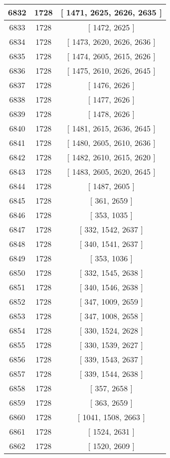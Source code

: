 \begin{center}
\begin{longtable}[H]{|| c c c ||}
\hline
6832 & 1728 & [ 1471, 2625, 2626, 2635 ] \\ 
\hline
6833 & 1728 & [ 1472, 2625 ] \\ 
\hline
6834 & 1728 & [ 1473, 2620, 2626, 2636 ] \\ 
\hline
6835 & 1728 & [ 1474, 2605, 2615, 2626 ] \\ 
\hline
6836 & 1728 & [ 1475, 2610, 2626, 2645 ] \\ 
\hline
6837 & 1728 & [ 1476, 2626 ] \\ 
\hline
6838 & 1728 & [ 1477, 2626 ] \\ 
\hline
6839 & 1728 & [ 1478, 2626 ] \\ 
\hline
6840 & 1728 & [ 1481, 2615, 2636, 2645 ] \\ 
\hline
6841 & 1728 & [ 1480, 2605, 2610, 2636 ] \\ 
\hline
6842 & 1728 & [ 1482, 2610, 2615, 2620 ] \\ 
\hline
6843 & 1728 & [ 1483, 2605, 2620, 2645 ] \\ 
\hline
6844 & 1728 & [ 1487, 2605 ] \\ 
\hline
6845 & 1728 & [ 361, 2659 ] \\ 
\hline
6846 & 1728 & [ 353, 1035 ] \\ 
\hline
6847 & 1728 & [ 332, 1542, 2637 ] \\ 
\hline
6848 & 1728 & [ 340, 1541, 2637 ] \\ 
\hline
6849 & 1728 & [ 353, 1036 ] \\ 
\hline
6850 & 1728 & [ 332, 1545, 2638 ] \\ 
\hline
6851 & 1728 & [ 340, 1546, 2638 ] \\ 
\hline
6852 & 1728 & [ 347, 1009, 2659 ] \\ 
\hline
6853 & 1728 & [ 347, 1008, 2658 ] \\ 
\hline
6854 & 1728 & [ 330, 1524, 2628 ] \\ 
\hline
6855 & 1728 & [ 330, 1539, 2627 ] \\ 
\hline
6856 & 1728 & [ 339, 1543, 2637 ] \\ 
\hline
6857 & 1728 & [ 339, 1544, 2638 ] \\ 
\hline
6858 & 1728 & [ 357, 2658 ] \\ 
\hline
6859 & 1728 & [ 363, 2659 ] \\ 
\hline
6860 & 1728 & [ 1041, 1508, 2663 ] \\ 
\hline
6861 & 1728 & [ 1524, 2631 ] \\ 
\hline
6862 & 1728 & [ 1520, 2609 ] \\ 

\end{longtable}
\end{center}
